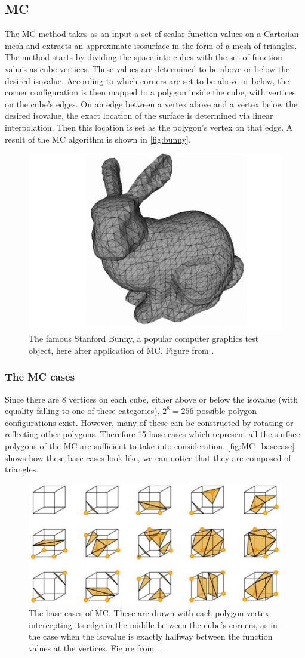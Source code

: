 \subsection{\Acl{MC}} 
The \acf{MC} method \cite{Marching2006} takes as an input a set of scalar function values on a Cartesian mesh and extracts an approximate isosurface in the form of a mesh of triangles. The method starts by dividing the space into cubes with the set of function values as cube vertices. These values are determined to be above or below the desired isovalue. According to which corners are set to be above or below, the corner configuration is then mapped to a polygon inside the cube, with vertices on the cube's edges. On an edge between a vertex above and a vertex below the desired isovalue, the exact location of the surface is determined via linear interpolation. Then this location is set as the polygon's vertex on that edge. A result of the \ac{MC} algorithm is shown in \autoref{fig:bunny}.

\begin{figure}
\centering
   \includegraphics[width=.25\textwidth]{Pictures/SurfaceReconstruction/new_bunny.png}
   \caption{The famous Stanford Bunny, a popular computer graphics test object, here after application of \ac{MC}. Figure from \cite{NielsonParametrization}. }
   \label{fig:bunny}
\end{figure}


\subsubsection{The \acl{MC} cases}
Since there are 8 vertices on each cube, either above or below the isovalue (with equality falling to one of these categories), $2^8=256$ possible polygon configurations exist. However, many of these can be constructed by rotating or reflecting other polygons. Therefore 15 base cases which represent all the surface polygons of the \acl{MC} are sufficient to take into consideration. \autoref{fig:MC_basecase} shows how these base cases look like, we can notice that they are composed of triangles. 

\begin{figure}
\centering
   \includegraphics[width=.5\textwidth]{Pictures/cubes.pdf}
   \caption{The base cases of \ac{MC}. These are drawn with each polygon vertex intercepting its edge in the middle between the cube's corners, as in the case when the isovalue is exactly halfway between the function values at the vertices. Figure from \cite{Marching2006}.}
   \label{fig:MC_basecase}
\end{figure}

